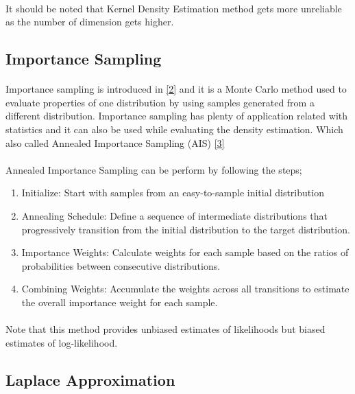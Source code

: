 \documentclass{article}
\begin{document}
    \paragraph{}
    It should be noted that Kernel Density Estimation method gets more unreliable as the number of dimension gets higher.
    
    \subsection{Importance Sampling}
    \paragraph{}
    Importance sampling is introduced in \hyperref[sec: ref2]{[2]} and it is a Monte Carlo method used to evaluate properties of one distribution by using samples generated from a different distribution. Importance sampling has plenty of application related with statistics and it can also be used while evaluating the density estimation. Which also called Annealed Importance Sampling (AIS) \hyperref[sec: ref3]{[3]}
    \paragraph{}
    Annealed Importance Sampling can be perform by following the steps;
    \begin{enumerate}
        \item Initialize: Start with samples from an easy-to-sample initial distribution
        \item Annealing Schedule: Define a sequence of intermediate distributions that progressively transition from the initial distribution to the target distribution.
        \item Importance Weights: Calculate weights for each sample based on the ratios of probabilities between consecutive distributions.
        \item Combining Weights: Accumulate the weights across all transitions to estimate the overall importance weight for each sample.
    \end{enumerate}

    \paragraph{}
    Note that this method provides unbiased estimates of likelihoods but biased estimates of log-likelihood.
    
    \subsection{Laplace Approximation}
\end{document}
